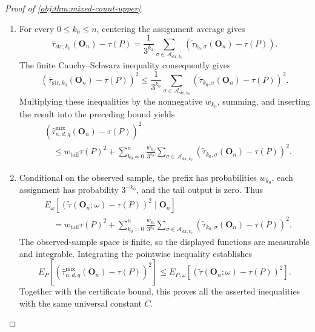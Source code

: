 \begin{proof}[Proof of \cref{obj:thm:mixed-count-upper}]
\begin{enumerate}
\item For every \(0\le k_0\le n\), centering the assignment average gives
\[
\overline\tau_{\mathrm{str},k_0}(\mathbf O_n)-\tau(P)
=
\frac{1}{3^{k_0}}
\sum_{\sigma\in\mathcal A_{\mathrm{str},k_0}}
\left(
\widetilde\tau_{k_0,\sigma}(\mathbf O_n)-\tau(P)
\right).
\]
The finite Cauchy--Schwarz inequality consequently gives
\[
\left(
\overline\tau_{\mathrm{str},k_0}(\mathbf O_n)-\tau(P)
\right)^2
\le
\frac{1}{3^{k_0}}
\sum_{\sigma\in\mathcal A_{\mathrm{str},k_0}}
\left(
\widetilde\tau_{k_0,\sigma}(\mathbf O_n)-\tau(P)
\right)^2.
\]
Multiplying these inequalities by the nonnegative \(w_{k_0}\), summing, and inserting the result into the preceding bound yields
\[
\begin{aligned}
&\left(
\widehat\tau^{\mathrm{mix}}_{n,d,q}(\mathbf O_n)-\tau(P)
\right)^2\\
&\quad\le
w_{\mathrm{tail}}\tau(P)^2
+
\sum_{k_0=0}^{n}\frac{w_{k_0}}{3^{k_0}}
\sum_{\sigma\in\mathcal A_{\mathrm{str},k_0}}
\left(
\widetilde\tau_{k_0,\sigma}(\mathbf O_n)-\tau(P)
\right)^2.
\end{aligned}
\]

\item Conditional on the observed sample, the prefix has probabilities \(w_{k_0}\), each assignment has probability \(3^{-k_0}\), and the tail output is zero. Thus
\[
\begin{aligned}
&E_\omega\!\left[
\left(\widetilde\tau(\mathbf O_n;\omega)-\tau(P)\right)^2
\mid\mathbf O_n
\right]\\
&\quad=
w_{\mathrm{tail}}\tau(P)^2
+
\sum_{k_0=0}^{n}\frac{w_{k_0}}{3^{k_0}}
\sum_{\sigma\in\mathcal A_{\mathrm{str},k_0}}
\left(
\widetilde\tau_{k_0,\sigma}(\mathbf O_n)-\tau(P)
\right)^2.
\end{aligned}
\]
The observed-sample space is finite, so the displayed functions are measurable and integrable. Integrating the pointwise inequality establishes
\[
E_P\!\left[
\left(
\widehat\tau^{\mathrm{mix}}_{n,d,q}(\mathbf O_n)-\tau(P)
\right)^2
\right]
\le
E_{P,\omega}\!\left[
\left(
\widetilde\tau(\mathbf O_n;\omega)-\tau(P)
\right)^2
\right].
\]
Together with the certificate bound, this proves all the asserted inequalities with the same universal constant \(\overline C\).
\end{enumerate}
\end{proof}

